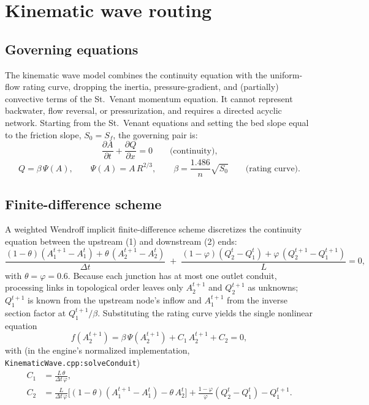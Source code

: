\documentclass[11pt,a4paper]{article}
\begin{document}
\section{Kinematic wave routing}

\subsection{Governing equations}

The kinematic wave model combines the continuity equation with the uniform-flow
rating curve, dropping the inertia, pressure-gradient, and (partially)
convective terms of the St.\ Venant momentum equation. It cannot represent
backwater, flow reversal, or pressurization, and requires a directed acyclic
network. Starting from the St.\ Venant equations and setting the bed slope
equal to the friction slope, $S_0 = S_f$, the governing pair is:
\begin{equation}
  \frac{\partial A}{\partial t} + \frac{\partial Q}{\partial x} = 0
  \qquad\text{(continuity),}
\end{equation}
\begin{equation}
  Q = \beta\,\Psi(A), \qquad \Psi(A) = A\,R^{2/3},
  \qquad \beta = \frac{1.486}{n}\sqrt{S_0}
  \qquad\text{(rating curve).}
\end{equation}

\subsection{Finite-difference scheme}

A weighted Wendroff implicit finite-difference scheme discretizes the
continuity equation between the upstream (1) and downstream (2) ends:
\begin{equation}
  \frac{(1-\theta)(A_1^{t+1}-A_1^{t}) +
        \theta\,(A_2^{t+1}-A_2^{t})}{\Delta t}
  \;+\;
  \frac{(1-\varphi)(Q_2^{t}-Q_1^{t}) +
        \varphi\,(Q_2^{t+1}-Q_1^{t+1})}{L}
  = 0,
\end{equation}
with $\theta = \varphi = 0.6$. Because each junction has at most one outlet
conduit, processing links in topological order leaves only $A_2^{t+1}$ and
$Q_2^{t+1}$ as unknowns; $Q_1^{t+1}$ is known from the upstream node's inflow
and $A_1^{t+1}$ from the inverse section factor at $Q_1^{t+1}/\beta$.
Substituting the rating curve yields the single nonlinear equation
\begin{equation}
  f\!\left(A_2^{t+1}\right) = \beta\,\Psi\!\left(A_2^{t+1}\right) +
  C_1\,A_2^{t+1} + C_2 = 0,
\end{equation}
with (in the engine's normalized implementation,
\texttt{KinematicWave.cpp:solveConduit})
\begin{align}
  C_1 &= \frac{L\,\theta}{\Delta t\,\varphi},\\
  C_2 &= \frac{L}{\Delta t\,\varphi}
        \Big[(1-\theta)(A_1^{t+1} - A_1^t) - \theta\,A_2^t\Big]
        + \frac{1-\varphi}{\varphi}(Q_2^t - Q_1^t) - Q_1^{t+1}.
\end{align}
\end{document}
